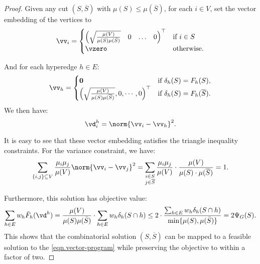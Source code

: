 \documentclass[letterpaper]{article}
\begin{document}
\subsection{}
\label{sec.appendix.omitted.sdp-algorithm}
\symrelaxation*
\begin{proof}
Given any cut $(S,\overline{S})$ with $\mu(S) \leq \mu(\overline{S})$, for each $i \in V$,
set the vector embedding of the vertices to
\begin{equation*}
\vv_i = \begin{cases}
\begin{pmatrix} \sqrt{\frac{\mu(V)}{\mu(S) \mu(\bar{S})}} & 0 & \ldots & 0 \end{pmatrix}^{\top} & \mbox{if } i \in S \\
\vzero & \mbox{otherwise.}
\end{cases}
\end{equation*}

\noindent
And for each hyperedge $h\in E$:
\[
    \vv_h = \begin{cases}
            \boldsymbol{0} & \text{if } \delta_h(S) = F_h(S),\\
            \left(\sqrt{\mu(V) \over \mu(S)\mu(\overline{S})}, 0 , \cdots , 0 \right)^\top &\text{if } \delta_h(S) = F_h(\overline{S}).
        \end{cases}
\]
We then have:
\[
    \vd_i^h = \norm{\vv_i - \vv_h}^2.
\]

It is easy to see that these vector embedding satisfies the triangle inequality constraints. For the variance constraint, we have:
\[
    \sum_{\{i,j\} \subseteq V} {\mu_i \mu_j\over \mu(V)} \norm{\vv_i - \vv_j}^2 = \sum_{\substack{i\in S\\ j\in \overline{S}}} {\mu_i\mu_j\over \mu(V)} \cdot {\mu(V) \over \mu(S) \cdot \mu(\overline{S})} =1.
\]

Furthermore, this solution has objective value:
$$
\sum_{h \in E} w_h \bar{F}_h(\vd^h) = \frac{\mu(V)}{\mu(S) \mu(\bar{S})} \cdot \sum_{h \in E} w_h \delta_h(S\cap h) \leq 2 \cdot \frac{\sum_{h \in E} w_h \delta_h(S \cap h) }{\min\{\mu(S), \mu(\bar{S})\}} = 2 \Psi_G(S).
$$
This shows that the combinatorial solution $(S,\overline{S})$ can be mapped to a feasible solution to the \ref{eqn.vector-program} while preserving the objective to within a factor of two.
\end{proof}
\end{document}
